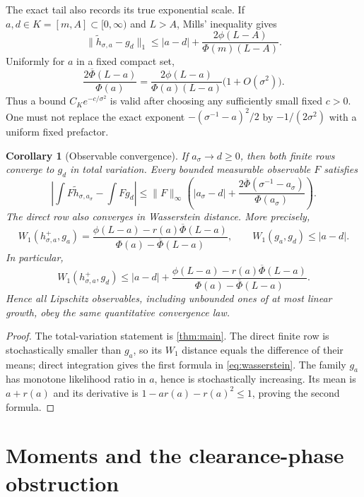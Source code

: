\documentclass[11pt]{article}
\newtheorem{corollary}[theorem]{Corollary}
\theoremstyle{remark}
\begin{document}
The exact tail also records its true exponential scale.  If
$a,d\in K=[m,A]\subset[0,\infty)$ and $L>A$, Mills' inequality gives
\begin{equation}\label{eq:compact-mills}
 \|\widetilde h_{\sigma,a}-g_d\|_1
 \le |a-d|+
 \frac{2\phi(L-A)}{\Phi(m)(L-A)}.
\end{equation}
Uniformly for $a$ in a fixed compact set,
\begin{equation}\label{eq:tail-asymptotic}
 \frac{2\overline\Phi(L-a)}{\Phi(a)}
 =\frac{2\phi(L-a)}{\Phi(a)(L-a)}
 \bigl(1+O(\sigma^2)\bigr).
\end{equation}
Thus a bound $C_K e^{-c/\sigma^2}$ is valid after choosing any sufficiently
small fixed $c>0$.  One must not replace the exact exponent
$-(\sigma^{-1}-a)^2/2$ by $-1/(2\sigma^2)$ with a uniform fixed prefactor.

\begin{corollary}[Observable convergence]\label{cor:observables}
If $a_\sigma\to d\ge0$, then both finite rows converge to $g_d$ in total
variation.  Every bounded measurable observable $F$ satisfies
\[
 \left|\int F\widetilde h_{\sigma,a_\sigma}
       -\int Fg_d\right|
 \le \|F\|_\infty
 \left(|a_\sigma-d|+
 \frac{2\overline\Phi(\sigma^{-1}-a_\sigma)}{\Phi(a_\sigma)}\right).
\]
The direct row also converges in Wasserstein distance.  More precisely,
\begin{equation}\label{eq:wasserstein}
 W_1(h^+_{\sigma,a},g_a)=
 \frac{\phi(L-a)-r(a)\overline\Phi(L-a)}
 {\Phi(a)-\overline\Phi(L-a)},
 \qquad
 W_1(g_a,g_d)\le |a-d|.
\end{equation}
In particular,
\[
 W_1(h^+_{\sigma,a},g_d)\le |a-d|+
 \frac{\phi(L-a)-r(a)\overline\Phi(L-a)}
 {\Phi(a)-\overline\Phi(L-a)}.
\]
Hence all Lipschitz observables, including unbounded ones of at most linear
growth, obey the same quantitative convergence law.
\end{corollary}

\begin{proof}
The total-variation statement is \cref{thm:main}.  The direct finite row is
stochastically smaller than $g_a$, so its $W_1$ distance equals the difference
of their means; direct integration gives the first formula in
\eqref{eq:wasserstein}.  The family $g_a$ has monotone likelihood ratio in
$a$, hence is stochastically increasing.  Its mean is $a+r(a)$ and its
derivative is $1-a r(a)-r(a)^2\le1$, proving the second formula.
\end{proof}

\section{Moments and the clearance-phase obstruction}
\end{document}
